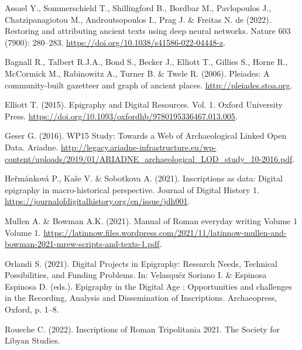 \documentclass[
  10pt,
]{article}
\newlength{\cslhangindent}
\newlength{\cslentryspacingunit} %
\newenvironment{CSLReferences}[2] %
 {%
  \setlength{\parindent}{0pt}
  \ifodd #1
  \let\oldpar\par
  \def\par{\hangindent=\cslhangindent\oldpar}
  \fi
  \setlength{\parskip}{#2\cslentryspacingunit}
 }%
 {}
\begin{document}
\hypertarget{refs}{}
\begin{CSLReferences}{1}{0}
\leavevmode{}%
Assael Y., Sommerschield T., Shillingford B., Bordbar M., Pavlopoulos
J., Chatzipanagiotou M., Androutsopoulos I., Prag J. \& Freitas N. de
(2022). Restoring and attributing ancient texts using deep neural
networks. Nature 603 (7900): 280--283.
\url{https://doi.org/10.1038/s41586-022-04448-z}.

\leavevmode{}%
Bagnall R., Talbert R.J.A., Bond S., Becker J., Elliott T., Gillies S.,
Horne R., McCormick M., Rabinowitz A., Turner B. \& Twele R. (2006).
Pleiades: {A} community-built gazetteer and graph of ancient places.
\url{http://pleiades.stoa.org}.

\leavevmode{}%
Elliott T. (2015). Epigraphy and {Digital} {Resources}. Vol. 1. Oxford
University Press.
\url{https://doi.org/10.1093/oxfordhb/9780195336467.013.005}.

\leavevmode{}%
Geser G. (2016). {WP15} {Study}: {Towards} a {Web} of {Archaeological}
{Linked} {Open} {Data}. Ariadne.
\url{http://legacy.ariadne-infrastructure.eu/wp-content/uploads/2019/01/ARIADNE_archaeological_LOD_study_10-2016.pdf}.

\leavevmode{}%
Heřmánková P., Kaše V. \& Sobotkova A. (2021). Inscriptions as data:
Digital epigraphy in macro-historical perspective. Journal of Digital
History 1. \url{https://journalofdigitalhistory.org/en/issue/jdh001}.

\leavevmode{}%
Mullen A. \& Bowman A.K. (2021). Manual of {Roman} everyday writing
{Volume} 1 {Volume} 1.
\url{https://latinnow.files.wordpress.com/2021/11/latinnow-mullen-and-bowman-2021-mrew-scripts-and-texts-1.pdf}.

\leavevmode{}%
Orlandi S. (2021). Digital {Projects} in {Epigraphy}: {Research}
{Needs}, {Technical} {Possibilities}, and {Funding} {Problems}. In:
Velasquéz Soriano I. \& Espinosa Espinosa D. (eds.). Epigraphy in the
{Digital} {Age} : {Opportunities} and challenges in the {Recording},
{Analysis} and {Dissemination} of {Inscriptions}. Archaeopress, Oxford,
p. 1--8.

\leavevmode{}%
Roueche C. (2022). Inscriptions of {Roman} {Tripolitania} 2021. The
Society for Libyan Studies.


\end{CSLReferences}
\end{document}
